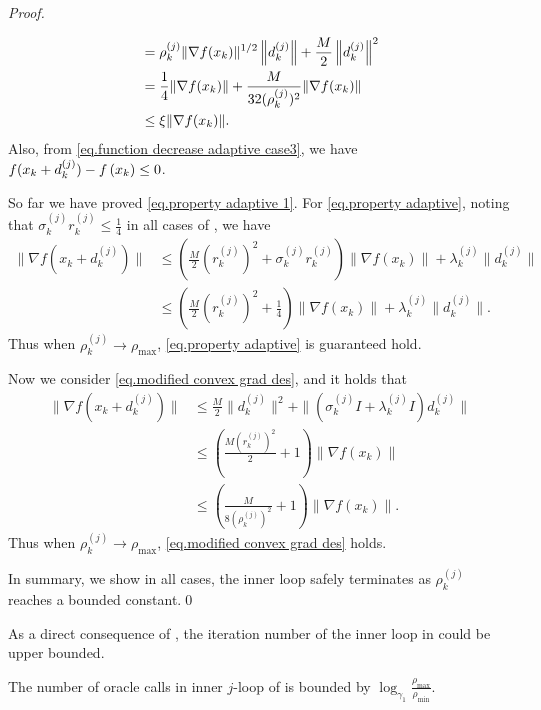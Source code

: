 \begin{proof}
\begin{itemize}
\begin{align}
                  \nonumber
                                              & = \rho_k^{(j)}\|\nabla f(x_k)\|^{1/2}\left\|d_k^{(j)}\right\|+\frac{M}{2}\left\|d_k^{(j)}\right\|^2 \\
                  \nonumber
                                              & =\frac{1}{4}\|\nabla f(x_k)\|+\frac{M}{32 (\rho_k^{(j)})^2}\|\nabla f(x_k)\|            \\
                                              & \leq \xi\|\nabla f(x_k)\|.
                  \label{eq.gradient norm adaptive case 3}
              \end{align}
              Also, from \eqref{eq.function decrease adaptive case3}, we have $f(x_k+d_k^{(j)})-f\left(x_k\right)\leq 0$.
    \end{itemize}
    So far we have proved \eqref{eq.property adaptive 1}. For \eqref{eq.property adaptive}, noting that $\sigma_k^{(j)} r_k^{(j)} \leq \frac{1}{4}$ in all cases of , we have
                \begin{equation}
            \label{eq.bound gradient adaptive}
            \begin{aligned}
                \| \nabla f(x_k+d_k^{(j)})\| &\leq \left (\frac{M}{2}(r_k^{(j)})^2 +\sigma_k^{(j)} r_k^{(j)}\right)\|\nabla f(x_k)\|+\lambda_k^{(j)}\|d_k^{(j)}\|\\
                &\leq \left (\frac{M}{2}(r_k^{(j)})^2 +\frac{1}{4}\right)\|\nabla f(x_k)\|+\lambda_k^{(j)}\|d_k^{(j)}\|.
            \end{aligned}
        \end{equation}
    Thus when $\rho_k^{(j)}\to \rho _{\max}$, \eqref{eq.property adaptive} is guaranteed hold.
    
    Now we consider \eqref{eq.modified convex grad des}, and it holds that 
    \begin{equation*}
        \begin{aligned}
            \|\nabla f(x_k+d_k^{(j)})\| &\leq \frac{M}{2}\|d_k^{(j)}\|^2 +\|\left (\sigma_k^{(j)}I+\lambda_k^{(j)}I\right)d_k^{(j)}\|\\
            &\leq \left(\frac{M(r_k^{(j)})^2}{2}+1\right)\|\nabla f(x_k)\|\\
            &\leq \left(\frac{M}{8(\rho_k^{(j)})^2}+1\right)\|\nabla f(x_k)\|.
        \end{aligned}
    \end{equation*}
    Thus when $\rho_k^{(j)}\to \rho_{\max}$, \eqref{eq.modified convex grad des} holds.
    
    In summary, we show in all cases, the inner loop safely terminates as $\rho_k^{(j)}$ reaches a bounded constant.\smartqed \qed
\end{proof}
As a direct consequence of , the iteration number of the inner loop in  could be upper bounded.
\begin{corollary}
    \label{coro.length j loop}
    The number of oracle calls in inner $j$-loop of  is bounded by $\log_{\gamma_1} \frac{\rho_{\max}}{\rho_{\min}}$.
\end{corollary}
